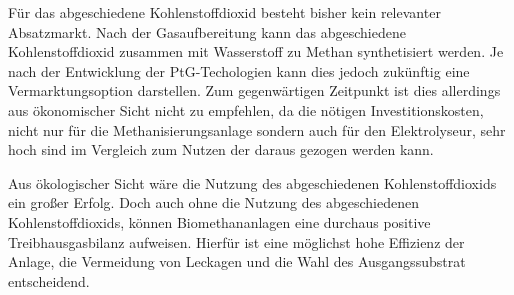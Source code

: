 Für das abgeschiedene Kohlenstoffdioxid besteht bisher kein relevanter Absatzmarkt. Nach der Gasaufbereitung kann das abgeschiedene Kohlenstoffdioxid zusammen mit Wasserstoff zu Methan synthetisiert werden. Je nach der Entwicklung der \gls{PtG}-Techologien kann dies jedoch zukünftig eine Vermarktungsoption darstellen. Zum gegenwärtigen Zeitpunkt ist dies allerdings aus ökonomischer Sicht nicht zu empfehlen, da die nötigen Investitionskosten, nicht nur für die Methanisierungsanlage sondern auch für den Elektrolyseur, sehr hoch sind im Vergleich zum Nutzen der daraus gezogen werden kann.\smallskip

Aus ökologischer Sicht wäre die Nutzung des abgeschiedenen Kohlenstoffdioxids ein großer Erfolg. Doch auch ohne die Nutzung des abgeschiedenen Kohlenstoffdioxids, können Biomethananlagen eine durchaus positive Treibhausgasbilanz aufweisen. Hierfür ist eine möglichst hohe Effizienz der Anlage, die Vermeidung von Leckagen und die Wahl des Ausgangssubstrat entscheidend.
